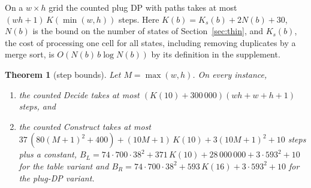 \documentclass[11pt]{article}
\newtheorem{theorem}{Theorem}
\begin{document}
On a $w\times h$ grid the counted plug DP with paths takes at most $(wh+1)\,K(\min(w,h))$ steps.
Here $K(b)=K_s(b)+2N(b)+30$, $N(b)$ is the bound on the number of states of
Section~\ref{sec:thin}, and $K_s(b)$, the cost of processing one cell for all states, including
removing duplicates by a merge sort, is $O(N(b)\,b\log N(b))$ by its definition in the supplement.

\begin{theorem}[step bounds]\label{thm:steps}
Let $M=\max(w,h)$. On every instance,
\begin{enumerate}
\item the counted Decide takes at most $(K(10)+300\,000)(wh+w+h+1)$ steps, and
\item the counted Construct takes at most $37\,(80(M+1)^2+400) + (10M+1)\,K(10) + 3(10M+1)^2 + 10$
  steps plus a constant, $B_L = 74\cdot 700\cdot 38^2 + 371\,K(10) + 28\,000\,000 + 3\cdot 593^2 +
  10$ for the table variant and $B_R = 74\cdot 700\cdot 38^2 + 593\,K(16) + 3\cdot 593^2 + 10$ for
  the plug-DP variant.
\end{enumerate}
\end{theorem}
\end{document}
